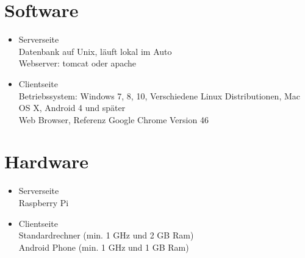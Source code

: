 \documentclass[pflichtenheft.tex]{subfiles}
\begin{document}
\section{Software}
\begin{itemize}
\item
Serverseite\\
Datenbank auf Unix, läuft lokal im Auto\\
Webserver: tomcat oder apache
\item
Clientseite\\
Betriebssystem: Windows 7, 8, 10, Verschiedene Linux Distributionen, Mac OS X, Android 4 und später\\
Web Browser, Referenz Google Chrome Version 46
\end{itemize}


\section{Hardware}
\begin{itemize}
\item
Serverseite\\
Raspberry Pi
\item
Clientseite\\
Standardrechner (min. 1 GHz und 2 GB Ram)\\
Android Phone (min. 1 GHz und 1 GB Ram)
\end{itemize}
\end{document}
